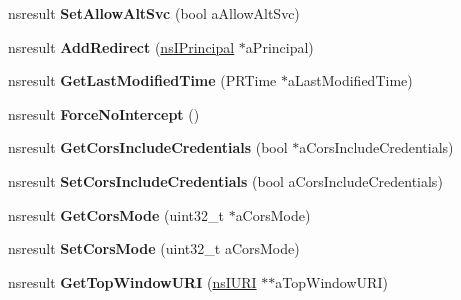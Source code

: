 \begin{DoxyCompactItemize}
nsresult {\bfseries Set\+Allow\+Alt\+Svc} (bool a\+Allow\+Alt\+Svc)
\item 
\mbox{\label{interfacens_i_http_channel_internal_a7e12e96e6902f6f7428fd2c40afa4e1d}} 
nsresult {\bfseries Add\+Redirect} (\hyperlink{interfacens_i_supports}{ns\+I\+Principal} $\ast$a\+Principal)
\item 
\mbox{\label{interfacens_i_http_channel_internal_a5c537074efc0267ceec8d0ef458b1f63}} 
nsresult {\bfseries Get\+Last\+Modified\+Time} (P\+R\+Time $\ast$a\+Last\+Modified\+Time)
\item 
\mbox{\label{interfacens_i_http_channel_internal_a727d1c384452bb1118660e0bf3af5a18}} 
nsresult {\bfseries Force\+No\+Intercept} ()
\item 
\mbox{\label{interfacens_i_http_channel_internal_addbe6f68b4c4ef397b4e37948dda57dd}} 
nsresult {\bfseries Get\+Cors\+Include\+Credentials} (bool $\ast$a\+Cors\+Include\+Credentials)
\item 
\mbox{\label{interfacens_i_http_channel_internal_a3977dbe4e7b6ccb087fe5323b1a65c51}} 
nsresult {\bfseries Set\+Cors\+Include\+Credentials} (bool a\+Cors\+Include\+Credentials)
\item 
\mbox{\label{interfacens_i_http_channel_internal_a4f429df5a0009a1adb1776ebaa7d221c}} 
nsresult {\bfseries Get\+Cors\+Mode} (uint32\+\_\+t $\ast$a\+Cors\+Mode)
\item 
\mbox{\label{interfacens_i_http_channel_internal_a3ad7555a2e5ebeb20b2daefba4c5a315}} 
nsresult {\bfseries Set\+Cors\+Mode} (uint32\+\_\+t a\+Cors\+Mode)
\item 
\mbox{\label{interfacens_i_http_channel_internal_a29317f94c1828fcb633ecc9605ac3b33}} 
nsresult {\bfseries Get\+Top\+Window\+U\+RI} (\hyperlink{interfacens_i_u_r_i}{ns\+I\+U\+RI} $\ast$$\ast$a\+Top\+Window\+U\+RI)
\item 
\mbox{\label{interfacens_i_http_channel_internal_a9f633d358af09a9e74f9dbb07d8f0816}} 
$$
\end{DoxyCompactItemize}
